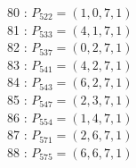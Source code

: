 \documentclass{article}
\begin{document}
{\begin{multicols}{3}
80 : $P_{522}=( 1, 0, 7, 1 )$\\
81 : $P_{533}=( 4, 1, 7, 1 )$\\
82 : $P_{537}=( 0, 2, 7, 1 )$\\
83 : $P_{541}=( 4, 2, 7, 1 )$\\
84 : $P_{543}=( 6, 2, 7, 1 )$\\
85 : $P_{547}=( 2, 3, 7, 1 )$\\
86 : $P_{554}=( 1, 4, 7, 1 )$\\
87 : $P_{571}=( 2, 6, 7, 1 )$\\
88 : $P_{575}=( 6, 6, 7, 1 )$\\
\end{multicols}


%


%


}%
\end{document}
